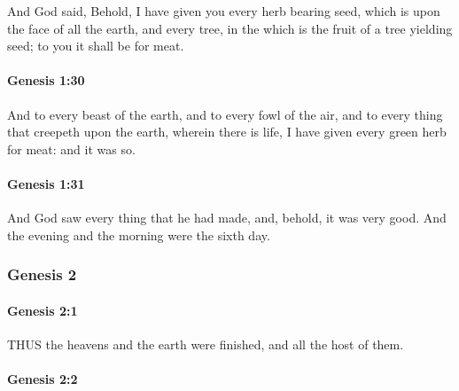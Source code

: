 			And God said, Behold, I have given you every herb bearing seed, which is upon the face of all the earth, and every tree, in the which is the fruit of a tree yielding seed; to you it shall be for meat. 

		\paragraph{Genesis 1:30} %
			\label{GENESIS-1-30}

			And to every beast of the earth, and to every fowl of the air, and to every thing that creepeth upon the earth, wherein there is life, I have given every green herb for meat: and it was so. 

		\paragraph{Genesis 1:31} %
			\label{GENESIS-1-31}

			And God saw every thing that he had made, and, behold, it was very good. And the evening and the morning were the sixth day.

	\subsubsection{Genesis 2} %
		\label{GENESIS-2}
		
		\paragraph{Genesis 2:1} %
			\label{GENESIS-2-1}

			THUS the heavens and the earth were finished, and all the host of them.


		\paragraph{Genesis 2:2} %
			\label{GENESIS-2-2}

